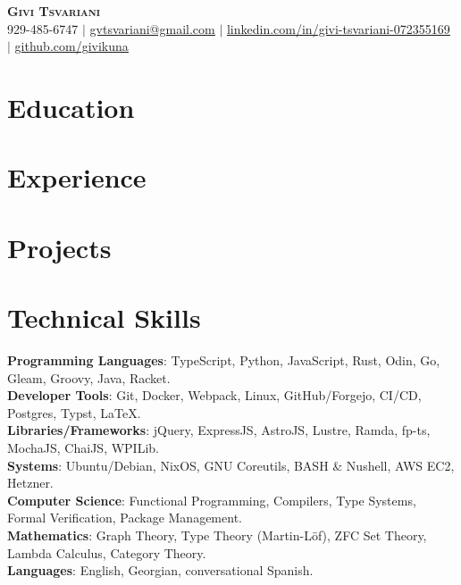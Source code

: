 \documentclass[letterpaper,11pt]{article}
\newcommand{\resumeSubHeadingListStart}{\begin{itemize}[leftmargin=0.15in, label={}]}
\newcommand{\resumeSubHeadingListEnd}{\end{itemize}}
\begin{document}
\begin{center}
    \textbf{\Huge \scshape Givi Tsvariani} \\ \vspace{1pt}
    \small 929-485-6747 $|$ \href{mailto:gvtsvariani@gmail.com}{\underline{gvtsvariani@gmail.com}} $|$ 
    \href{https://linkedin.com/in/givi-tsvariani-072355169}{\underline{linkedin.com/in/givi-tsvariani-072355169}} $|$
    \href{https://github.com/givikuna}{\underline{github.com/givikuna}}
\end{center}

\section{Education}
  \resumeSubHeadingListStart
  \resumeSubHeadingListEnd

\section{Experience}
  \resumeSubHeadingListStart
  \resumeSubHeadingListEnd

\section{Projects}
  \resumeSubHeadingListStart
  \resumeSubHeadingListEnd

\section{Technical Skills}
 \begin{itemize}[leftmargin=0.15in, label={}]
    \small{\item{
     \textbf{Programming Languages}{: TypeScript, Python, JavaScript, Rust, Odin, Go, Gleam, Groovy, Java, Racket.} \\
     \textbf{Developer Tools}{: Git, Docker, Webpack, Linux, GitHub/Forgejo, CI/CD, Postgres, Typst, LaTeX.} \\
     \textbf{Libraries/Frameworks}{: jQuery, ExpressJS, AstroJS, Lustre, Ramda, fp-ts, MochaJS, ChaiJS, WPILib.} \\
     \textbf{Systems}{: Ubuntu/Debian, NixOS, GNU Coreutils, BASH \& Nushell, AWS EC2, Hetzner.} \\
     \textbf{Computer Science}{: Functional Programming, Compilers, Type Systems, Formal Verification, Package Management.} \\
     \textbf{Mathematics}{: Graph Theory, Type Theory (Martin-Löf), ZFC Set Theory, Lambda Calculus, Category Theory.} \\
     \textbf{Languages}{: English, Georgian, conversational Spanish.}
    }}
 \end{itemize}
\end{document}

